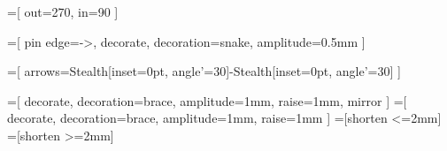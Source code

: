 =[
  out=270,
  in=90
]

=[
  pin edge={->, decorate, decoration={snake, amplitude=0.5mm}}
]

=[
  arrows={Stealth[inset=0pt, angle'=30]-Stealth[inset=0pt, angle'=30]}
]

\newcommand{\bottommeasure}[4][5mm] {
  \begin{scope}[line width=0.1mm]
    \coordinate (x) at ([yshift=-#1] #3);
    \draw (x) [measure] -- node [label={[label distance=-1mm]above:#2}] {} (x -| #4);
    \draw (#3) -- ++(0, -#1) -- +(0, -1.25mm);
    \draw (#4) -- ++(0, -#1) -- +(0, -1.25mm);
  \end{scope}
}

\newcommand{\topmeasure}[4][5mm] {
  \begin{scope}[line width=0.1mm]
    \coordinate (x) at ([yshift=#1] #3);
    \draw (x) [measure] -- node [label={[label distance=-1mm]above:#2}] {} (x -| #4);
    \draw (#3) -- ++(0, #1) -- +(0, 1.25mm);
    \draw (#4) -- ++(0, #1) -- +(0, 1.25mm);
  \end{scope}
}

=[
  decorate, decoration={brace, amplitude=1mm, raise=1mm, mirror}
]
=[
  decorate, decoration={brace, amplitude=1mm, raise=1mm}
]
=[shorten <=2mm]
=[shorten >=2mm]

\newcommand{\bracetobrace}[4] {
  \coordinate (a) at (#1);
  \coordinate (b) at (#2);
  \coordinate (c) at (#3);
  \coordinate (d) at (#4);
  \draw [bottombrace] (a) -- coordinate (e) (b);
  \draw [topbrace] (c) -- coordinate (f) (d);
  \draw [from brace, to brace, smooth, arrow] (e) to (f);
}

\newcommand{\toppointer}[2] {
  \draw ([yshift=1mm] #1) [Latex-] -- ([yshift=9mm] #1) node [anchor=south] {#2};
}

\newcommand{\topinject}[2] {
  \draw ([yshift=-4mm] #1) [Latex-, white border, draw=black] -- ([yshift=6mm] #1) node [anchor=south] {#2};
}

